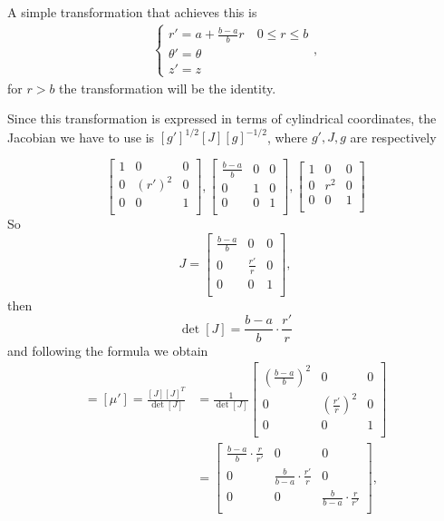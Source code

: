 \documentclass{amsart}
\begin{document}
A simple transformation that achieves this is
\begin{align}\label{transformation}
\begin{cases}
r'=a+\frac{b-a}{b}r \quad 0\leq r\leq b\\ 
\theta'=\theta\\
z'=z
\end{cases},
\end{align}
for \(r>b\) the transformation will be the identity.

Since this transformation is expressed in terms of cylindrical coordinates,
the Jacobian we have to use is \([g']^{1/2}[J][g]^{-1/2}\),
where \(g',J,g\) are respectively

\[
  \begin{bmatrix}
    1 & 0 & 0\\
    0 & (r')^2 & 0\\
    0 & 0 & 1\\
  \end{bmatrix},
  \begin{bmatrix}
    \frac{b-a}{b} & 0 & 0\\
    0 & 1 & 0\\
    0 & 0 & 1\\
  \end{bmatrix},
  \begin{bmatrix}
    1 & 0 & 0\\
    0 & r^2 & 0\\
    0 & 0 & 1\\
  \end{bmatrix}
\]
So
\[J=
  \begin{bmatrix}
    \frac{b-a}{b}  & 0 & 0\\
    0 & \frac{r'}{r} & 0\\
    0 & 0 & 1\\
  \end{bmatrix},
\]
then
\[
  \det[J]=\frac{b-a}{b}\cdot\frac{r'}{r}
\]
and following the formula we obtain
\begin{align*}
  [\varepsilon'] =[\mu']= \frac{[J][J]^T}{\det[J]}&=\frac{1}{\det[J]}
  \begin{bmatrix}
    \left(\frac{b-a}{b}\right)^2  & 0 & 0\\
    0 & \left(\frac{r'}{r}\right)^2 & 0\\
    0 & 0 & 1\\
  \end{bmatrix}\\
  &=
  \begin{bmatrix}
    \frac{b-a}{b}\cdot\frac{r}{r'}  & 0 & 0\\
    0 & \frac{b}{b-a}\cdot\frac{r'}{r} & 0\\
    0 & 0 & \frac{b}{b-a}\cdot\frac{r}{r'}\\
  \end{bmatrix},
\end{align*}
\end{document}
